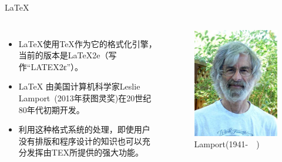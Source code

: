 \documentclass[13pt]{ctexbeamer}
\begin{document}
\begin{frame}{LaTeX}
	\begin{columns}[c]  %
		
		\column{6cm}
		
\begin{itemize}
		\item LaTeX使用TeX作为它的格式化引擎，当前的版本是LaTeX2e（写作“LATEX2ε”）。
	
	\item LaTeX 由美国计算机科学家Leslie~ Lamport~(2013年获图灵奖)在20世纪80年代初期开发。
	\item 利用这种格式系统的处理，即使用户没有排版和程序设计的知识也可以充分发挥由TEX所提供的强大功能。
\end{itemize}
		
	
		\column{5cm} 
		\begin{figure}[p]
			\includegraphics[scale=0.4]{Lamport.jpg}
			\caption{Lamport(1941-~~)}
		\end{figure}
		
	\end{columns}


\end{frame}


%
%    
%    
%
%
%    
%    
% 
\end{document}
